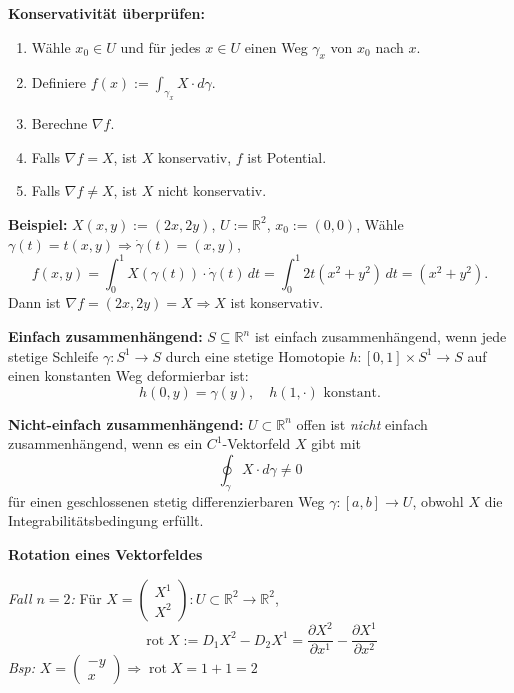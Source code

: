 \textbf{Konservativität überprüfen:}

\begin{enumerate}
  \item Wähle \( x_0 \in U \) und für jedes \( x \in U \) einen Weg \( \gamma_x \) von \( x_0 \) nach \( x \).
  \item Definiere \( f(x) := \int_{\gamma_x} X \cdot d\gamma \).
  \item Berechne \( \nabla f \).
  \item Falls \( \nabla f = X \), ist \( X \) konservativ, \( f \) ist Potential.
  \item Falls \( \nabla f \neq X \), ist \( X \) nicht konservativ.
\end{enumerate}

\textbf{Beispiel:}  
\( X(x, y) := (2x, 2y) \), \( U := \mathbb{R}^2 \), \( x_0 := (0,0) \),  
Wähle \( \gamma(t) = t(x,y) \Rightarrow \dot{\gamma}(t) = (x,y) \),  
\[
f(x, y) = \int_0^1 X(\gamma(t)) \cdot \dot{\gamma}(t)\,dt
= \int_0^1 2t(x^2 + y^2)\,dt = (x^2 + y^2).
\]  
Dann ist \( \nabla f = (2x, 2y) = X \Rightarrow X \) ist konservativ.

\textbf{Einfach zusammenhängend:}  
\( S \subseteq \mathbb{R}^n \) ist einfach zusammenhängend, wenn jede stetige Schleife \( \gamma : S^1 \to S \) durch eine stetige Homotopie \( h : [0,1] \times S^1 \to S \) auf einen konstanten Weg deformierbar ist:
\[
h(0, y) = \gamma(y), \quad h(1, \cdot) \text{ konstant}.
\]

\textbf{Nicht-einfach zusammenhängend:}  
\( U \subset \mathbb{R}^n \) offen ist \emph{nicht} einfach zusammenhängend, wenn es ein \( C^1 \)-Vektorfeld \( X \) gibt mit  
\[
\oint_\gamma X \cdot d\gamma \neq 0
\]
für einen geschlossenen stetig differenzierbaren Weg \( \gamma : [a,b] \to U \), obwohl \( X \) die Integrabilitätsbedingung erfüllt.

\textbf{Rotation eines Vektorfeldes}

\textit{Fall \(n=2\):} Für \( X = \begin{pmatrix} X^1 \\ X^2 \end{pmatrix} : U \subset \mathbb{R}^2 \to \mathbb{R}^2 \),
\[
\operatorname{rot} X := D_1 X^2 - D_2 X^1 = \frac{\partial X^2}{\partial x^1} - \frac{\partial X^1}{\partial x^2}
\]
\textit{Bsp:} \( X = \begin{pmatrix} -y \\ x \end{pmatrix} \Rightarrow \operatorname{rot} X = 1 + 1 = 2 \)

